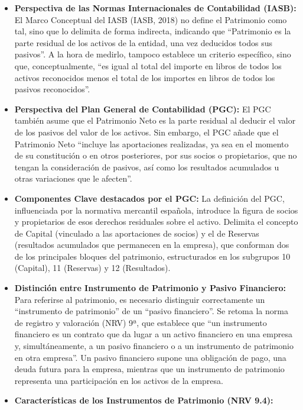 \documentclass[
  paper=a4,
  ,captions=tableheading
]{scrbook}
\begin{document}
\begin{itemize}
\item
  \textbf{Perspectiva de las Normas Internacionales de Contabilidad
  (IASB):} El Marco Conceptual del IASB (IASB, 2018) no define el
  Patrimonio como tal, sino que lo delimita de forma indirecta,
  indicando que ``Patrimonio es la parte residual de los activos de la
  entidad, una vez deducidos todos sus pasivos''. A la hora de medirlo,
  tampoco establece un criterio específico, sino que, conceptualmente,
  ``es igual al total del importe en libros de todos los activos
  reconocidos menos el total de los importes en libros de todos los
  pasivos reconocidos''.
\item
  \textbf{Perspectiva del Plan General de Contabilidad (PGC):} El PGC
  también asume que el Patrimonio Neto es la parte residual al deducir
  el valor de los pasivos del valor de los activos. Sin embargo, el PGC
  añade que el Patrimonio Neto ``incluye las aportaciones realizadas, ya
  sea en el momento de su constitución o en otros posteriores, por sus
  socios o propietarios, que no tengan la consideración de pasivos, así
  como los resultados acumulados u otras variaciones que le afecten''.
\item
  \textbf{Componentes Clave destacados por el PGC:} La definición del
  PGC, influenciada por la normativa mercantil española, introduce la
  figura de socios y propietarios de esos derechos residuales sobre el
  activo. Delimita el concepto de Capital (vinculado a las aportaciones
  de socios) y el de Reservas (resultados acumulados que permanecen en
  la empresa), que conforman dos de los principales bloques del
  patrimonio, estructurados en los subgrupos 10 (Capital), 11 (Reservas)
  y 12 (Resultados).
\item
  \textbf{Distinción entre Instrumento de Patrimonio y Pasivo
  Financiero:} Para referirse al patrimonio, es necesario distinguir
  correctamente un ``instrumento de patrimonio'' de un ``pasivo
  financiero''. Se retoma la norma de registro y valoración (NRV) 9ª,
  que establece que ``un instrumento financiero es un contrato que da
  lugar a un activo financiero en una empresa y, simultáneamente, a un
  pasivo financiero o a un instrumento de patrimonio en otra empresa''.
  Un pasivo financiero supone una obligación de pago, una deuda futura
  para la empresa, mientras que un instrumento de patrimonio representa
  una participación en los activos de la empresa.
\item
  \textbf{Características de los Instrumentos de Patrimonio (NRV 9.4):}


\end{itemize}
\end{document}
